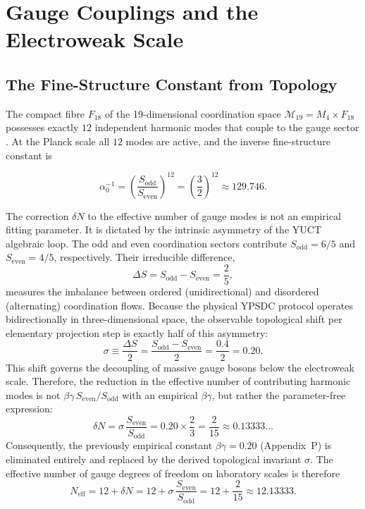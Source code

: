 \documentclass[12pt,a4paper]{article}
\theoremstyle{remark}
\begin{document}
	\section{Gauge Couplings and the Electroweak Scale}
	\label{sec:gauge}
	
	\subsection{The Fine-Structure Constant from Topology}
	
	The compact fibre \(F_{18}\) of the 19-dimensional coordination space
	\(\mathcal{M}_{19}=M_4\times F_{18}\) possesses exactly \(12\) independent
	harmonic modes that couple to the gauge sector \cite{AppendixG}.  At the Planck
	scale all \(12\) modes are active, and the inverse fine-structure constant is
	
	\begin{equation}
		\alpha_0^{-1} = \left(\frac{S_{\mathrm{odd}}}{S_{\mathrm{even}}}\right)^{12}
		= \left(\frac{3}{2}\right)^{12} \approx 129.746 .
	\end{equation}
	
	The correction \(\delta N\) to the effective number of gauge modes is not an
	empirical fitting parameter. It is dictated by the intrinsic asymmetry of the
	YUCT algebraic loop. The odd and even coordination sectors contribute
	\(S_{\mathrm{odd}} = 6/5\) and \(S_{\mathrm{even}} = 4/5\), respectively.
	Their irreducible difference,
	\[
	\Delta S = S_{\mathrm{odd}} - S_{\mathrm{even}} = \frac{2}{5},
	\]
	measures the imbalance between ordered (unidirectional) and disordered
	(alternating) coordination flows. Because the physical YPSDC protocol operates
	bidirectionally in three-dimensional space, the observable topological shift
	per elementary projection step is exactly half of this asymmetry:
	\[
	\sigma \equiv \frac{\Delta S}{2} = \frac{S_{\mathrm{odd}} - S_{\mathrm{even}}}{2}
	= \frac{0.4}{2} = 0.20.
	\]
	This shift governs the decoupling of massive gauge bosons below the
	electroweak scale. Therefore, the reduction in the effective number of
	contributing harmonic modes is not \(\beta\gamma\,S_{\mathrm{even}}/S_{\mathrm{odd}}\)
	with an empirical \(\beta\gamma\), but rather the parameter-free expression:
	\[
	\delta N = \sigma \, \frac{S_{\mathrm{even}}}{S_{\mathrm{odd}}}
	= 0.20 \times \frac{2}{3}
	= \frac{2}{15} \approx 0.13333\ldots
	\]
	Consequently, the previously empirical constant \(\beta\gamma = 0.20\)
	(Appendix~P) is eliminated entirely and replaced by the derived topological
	invariant \(\sigma\). The effective number of gauge degrees of freedom on
	laboratory scales is therefore
	\[
	N_{\mathrm{eff}} = 12 + \delta N = 12 + \sigma\,\frac{S_{\mathrm{even}}}{S_{\mathrm{odd}}}
	= 12 + \frac{2}{15} \approx 12.13333 .
	\]
	
\end{document}
